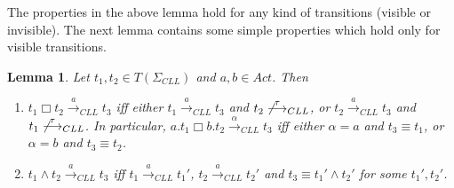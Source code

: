 \documentclass{elsarticle}
\theoremstyle{plain}
\newtheorem{lemma}[theorem]{Lemma}
\theoremstyle{definition}
\begin{document}
The properties in the above lemma hold for any kind of transitions (visible or invisible). The next lemma contains some simple properties which hold only for visible transitions.

\begin{lemma}\label{L:Basic_II}
Let $t_1,t_2\in T(\Sigma_{CLL})$ and $a,b \in Act$. Then
    \begin{enumerate}
      \item  $t_1 \Box t_2 \stackrel{a}{\longrightarrow}_{{CLL}} t_3$ iff  either $t_1 \stackrel{a}{\longrightarrow}_{{CLL}} t_3$ and $t_2 \not\stackrel{\tau}{\longrightarrow}_{CLL}$, or $t_2 \stackrel{a}{\longrightarrow}_{{CLL}} t_3$ and $t_1 \not\stackrel{\tau}{\longrightarrow}_{CLL}$.
          In particular, $a.t_1 \Box b.t_2 \stackrel{\alpha}{\longrightarrow}_{{CLL}} t_3$ iff  either $\alpha = a$ and $t_3 \equiv t_1$, or $\alpha = b$ and $t_3 \equiv t_2$.
      \item $t_1\wedge t_2 \stackrel{a}{\longrightarrow}_{CLL}t_3$ iff $t_1 \stackrel{a}{\longrightarrow}_{CLL} t_1'$, $t_2 \stackrel{a}{\longrightarrow}_{CLL}t_2'$ and $t_3\equiv t_1'\wedge t_2'$ for some $t_1',t_2'$.
    \end{enumerate}
\end{lemma}
\end{document}
